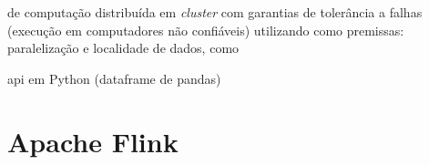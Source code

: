 
de computação distribuída em \emph{cluster} com garantias de tolerância a falhas
(execução em computadores não confiáveis) utilizando como premissas: paralelização
e localidade de dados, como 

api em Python (dataframe de pandas)


\section{Apache Flink}


